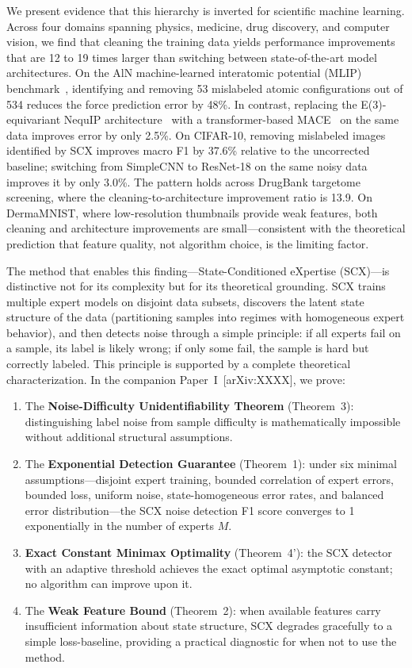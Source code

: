 \documentclass[12pt,a4paper]{article}
\begin{document}
We present evidence that this hierarchy is inverted for scientific machine learning. Across four domains spanning physics, medicine, drug discovery, and computer vision, we find that cleaning the training data yields performance improvements that are 12 to 19 times larger than switching between state-of-the-art model architectures. On the AlN machine-learned interatomic potential (MLIP) benchmark~\cite{shapeev2016moment}, identifying and removing 53 mislabeled atomic configurations out of 534 reduces the force prediction error by 48\%. In contrast, replacing the E(3)-equivariant NequIP architecture~\cite{batzner2022e3nn} with a transformer-based MACE~\cite{batatia2022mace} on the same data improves error by only 2.5\%. On CIFAR-10, removing mislabeled images identified by SCX improves macro F1 by 37.6\% relative to the uncorrected baseline; switching from SimpleCNN to ResNet-18 on the same noisy data improves it by only 3.0\%. The pattern holds across DrugBank targetome screening, where the cleaning-to-architecture improvement ratio is 13.9. On DermaMNIST, where low-resolution thumbnails provide weak features, both cleaning and architecture improvements are small---consistent with the theoretical prediction that feature quality, not algorithm choice, is the limiting factor.

The method that enables this finding---State-Conditioned eXpertise (SCX)---is distinctive not for its complexity but for its theoretical grounding. SCX trains multiple expert models on disjoint data subsets, discovers the latent state structure of the data (partitioning samples into regimes with homogeneous expert behavior), and then detects noise through a simple principle: if all experts fail on a sample, its label is likely wrong; if only some fail, the sample is hard but correctly labeled. This principle is supported by a complete theoretical characterization. In the companion Paper~I~[arXiv:XXXX], we prove:

\begin{enumerate}
    \item The \textbf{Noise-Difficulty Unidentifiability Theorem} (Theorem~3): distinguishing label noise from sample difficulty is mathematically impossible without additional structural assumptions.
    \item The \textbf{Exponential Detection Guarantee} (Theorem~1): under six minimal assumptions---disjoint expert training, bounded correlation of expert errors, bounded loss, uniform noise, state-homogeneous error rates, and balanced error distribution---the SCX noise detection F1 score converges to 1 exponentially in the number of experts $M$.
    \item \textbf{Exact Constant Minimax Optimality} (Theorem~4'): the SCX detector with an adaptive threshold achieves the exact optimal asymptotic constant; no algorithm can improve upon it.
    \item The \textbf{Weak Feature Bound} (Theorem~2): when available features carry insufficient information about state structure, SCX degrades gracefully to a simple loss-baseline, providing a practical diagnostic for when not to use the method.
\end{enumerate}
\end{document}
